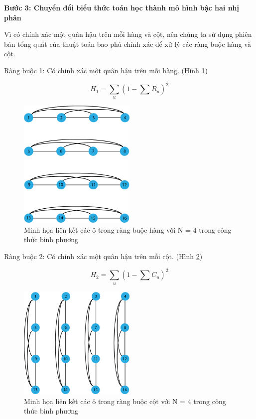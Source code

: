 \textbf{Bước 3: Chuyển đổi biểu thức toán học thành mô hình bậc hai nhị phân}


Vì có chính xác một quân hậu trên mỗi hàng và cột, nên chúng ta sử dụng phiên bản tổng quát của thuật toán bao phủ chính xác \cite{Ising formulations} để xử lý các ràng buộc hàng và cột. 

Ràng buộc 1: Có chính xác một quân hậu trên mỗi hàng. (Hình \ref{fig:row-square-constraint})

\[
H_1 = \sum_{u}^{}{(1-\sum{}^{}{R_u})^2}
\]

\begin{figure}[H]
	\centering
	\includegraphics[width=0.5\textwidth]{images/row-square-constraint.png}
	\caption{Minh họa liên kết các ô trong ràng buộc hàng với N = 4 trong công thức bình phương}
	\label{fig:row-square-constraint}
\end{figure}


Ràng buộc 2: Có chính xác một quân hậu trên mỗi cột. (Hình \ref{fig:col-square-constraint})

\[
H_2 = \sum_{u}^{}{(1-\sum{}^{}{C_u})^2}
\]
\begin{figure}[H]
	\centering
	\includegraphics[width=0.5\textwidth]{images/col-square-constraint.png}
	\caption{Minh họa liên kết các ô trong ràng buộc cột với N = 4 trong công thức bình phương}
	\label{fig:col-square-constraint}
\end{figure}


